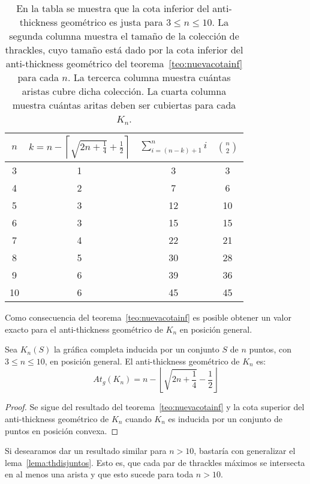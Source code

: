   \begin{table}[t]
    \centering
    \begin{tabular}{|c|c|c|c|}
      \hline
      $n$ & $k=n - \left\lceil\sqrt{2n+\frac{1}{4}} + \frac{1}{2}\right\rceil$ & $\sum^n_{i=(n-k) + 1}i$ & $\binom{n}{2}$\\[5pt] \hline\hline
      3   & 1  & 3 & 3 \\ \hline
      4   & 2  & 7 & 6 \\ \hline
      5   & 3  & 12 & 10 \\ \hline
      6   & 3  & 15 & 15 \\ \hline
      7   & 4  & 22 & 21 \\ \hline
      8   & 5  & 30 & 28 \\ \hline
      9   & 6  & 39 & 36 \\ \hline
      10  & 6  & 45 & 45 \\ \hline
    \end{tabular}
    \caption{En la tabla se muestra que la cota inferior del anti-thickness
    geométrico es justa para $3 \leq n \leq 10$. La segunda columna muestra el
    tamaño de la colección de thrackles, cuyo tamaño está dado por la cota
    inferior del anti-thickness geométrico del teorema~\ref{teo:nuevacotainf}
    para cada $n$. La tercerca columna muestra cuántas aristas cubre dicha
    colección. La cuarta columna muestra cuántas aritas deben ser cubiertas para
    cada $K_n$.}
    \label{table:atnuevacota}
  \end{table}

  Como consecuencia del teorema~\ref{teo:nuevacotainf} es posible obtener un valor exacto para el anti-thickness geométrico de $K_n$ en posición general.
  \begin{theorem}
    Sea $K_n(S)$ la gráfica completa inducida por un conjunto $S$ de $n$ puntos, con $3 \leq n \leq 10$, en posición general. El anti-thickness geométrico de $K_n$ es:
    \[ At_g(K_n) = n - \left\lfloor\sqrt{2n + \frac{1}{4}} - \frac{1}{2}\right\rfloor \]
  \end{theorem}
  \begin{proof}
    Se sigue del resultado del teorema~\ref{teo:nuevacotainf} y la cota superior del anti-thickness geométrico de $K_n$ cuando $K_n$ es inducida por un conjunto de puntos en posición convexa.
  \end{proof}

  Si desearamos dar un resultado similar para $n > 10$, bastaría con generalizar el
  lema~\ref{lema:thdisjuntos}. Esto es, que cada par de thrackles máximos se
  intersecta en al menos una arista y que esto sucede para toda $n > 10$.


